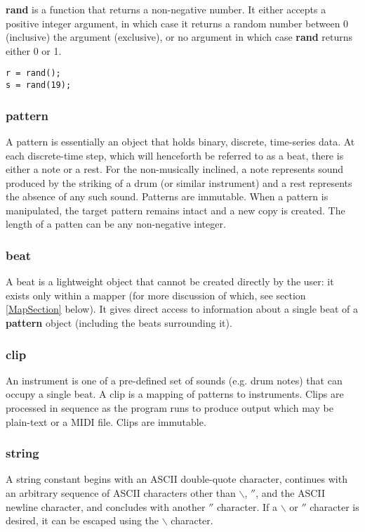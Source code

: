 \textbf{rand} is a function that returns a non-negative number.  It either accepts a positive integer argument, in which case it returns a random number between 0 (inclusive) the argument (exclusive), or no argument in which case \textbf{rand} returns either 0 or 1.
\begin{verbatim}
r = rand();
s = rand(19);
\end{verbatim}
\subsubsection{pattern}

A pattern is essentially an object that holds binary, discrete, time-series data.  At each discrete-time step, which will henceforth be referred to as a beat, there is either a note or a rest.  For the non-musically inclined, a note represents sound produced by the striking of a drum (or similar instrument) and a rest represents the absence of any such sound.  Patterns are immutable.  When a pattern is manipulated, the target pattern remains intact and a new copy is created.  The length of a patten can be any non-negative integer.

\subsubsection{beat}

A beat is a lightweight object that cannot be created directly by the user: it exists only within a mapper (for more discussion of which, see section \ref{MapSection} below).  It gives direct access to information about a single beat of a \textbf{pattern} object (including the beats surrounding it).

\subsubsection{clip}

An instrument is one of a pre-defined set of sounds (e.g. drum notes) that can occupy a single beat.
A clip is a mapping of patterns to instruments. Clips are processed in sequence as the program runs to produce output which may be plain-text or a MIDI file.  Clips are immutable.

\subsubsection{string}

A string constant begins with an ASCII double-quote character, continues
with an arbitrary sequence of ASCII characters other than $\backslash$, $''$, and the ASCII newline character,
and concludes with another $''$ character.  If a $\backslash$ or $''$ character is
desired, it can be escaped using the $\backslash$ character.

